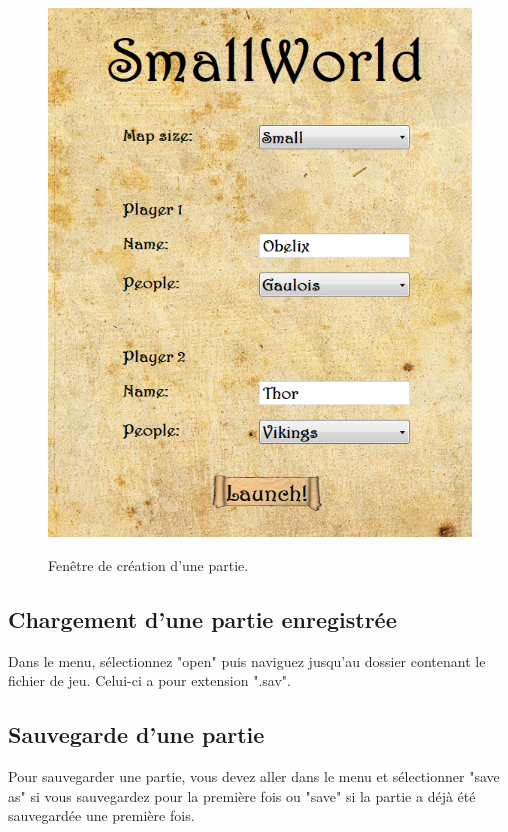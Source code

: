 \documentclass[a4paper,12pt]{article}
\begin{document}
\begin{figure}[H]
   \includegraphics[width=\textwidth]{create.png}
   \label{fig:create}
   \caption{Fenêtre de création d'une partie.}
\end{figure}
\FloatBarrier

\subsection{Chargement d'une partie enregistrée}
Dans le menu, sélectionnez "open" puis naviguez jusqu'au dossier contenant le fichier de jeu. Celui-ci a pour extension ".sav". 

\subsection{Sauvegarde d'une partie}
Pour sauvegarder une partie, vous devez aller dans le menu et sélectionner "save as" si vous sauvegardez pour la première fois ou "save" si la partie a déjà été sauvegardée une première fois.
\end{document}
